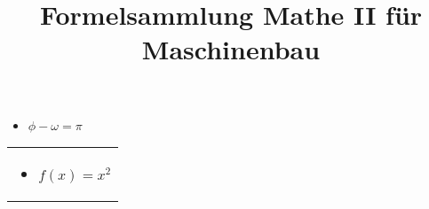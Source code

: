 \documentclass{scrartcl}
\begin{document}
	\title{Formelsammlung Mathe II f\"ur Maschinenbau}
	\date{}
	\author{}
	\maketitle
	
\begin{minipage}{0,45 \textwidth}
	\begin{itemize}
	\item $\phi - \omega = \pi$
	\end{itemize}
\end{minipage}%
\hfill
\begin{minipage}{0,45 \textwidth}
	\begin{tabular}{|p{\textwidth}}
		\begin{itemize}
			\item $f(x) = x^2$
		\end{itemize}

\end{tabular}
\end{minipage}%
\end{document}
